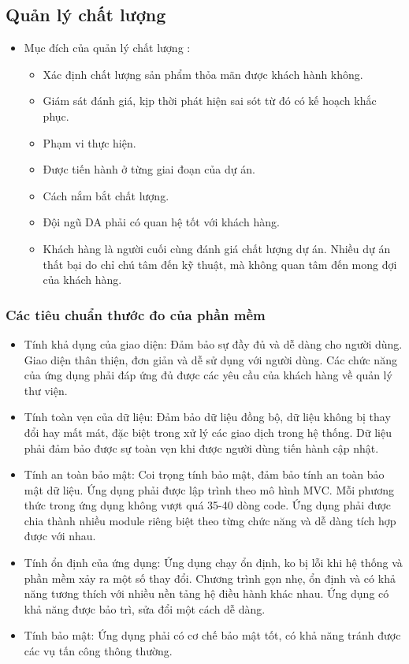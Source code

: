 \documentclass[12pt]{article}
\begin{document}
\subsection{Quản lý chất lượng}
\begin{itemize}[label=-, leftmargin=1cm]
    \item Mục đích của quản lý chất lượng :
    \begin{itemize}[label=+, leftmargin=1cm]
        \item Xác định chất lượng sản phẩm thỏa mãn được khách hành không.
        \item Giám sát đánh giá, kịp thời phát hiện sai sót từ đó có kế hoạch khắc phục.
        \item Phạm vi thực hiện.
        \item Được tiến hành ở từng giai đoạn của dự án.
        \item Cách nắm bắt chất lượng.
        \item Đội ngũ DA phải có quan hệ tốt với khách hàng.
        \item Khách hàng là người cuối cùng đánh giá chất lượng dự án. Nhiều dự án thất bại do chỉ chú tâm đến kỹ thuật, mà không quan tâm đến mong đợi của khách hàng.
    \end{itemize}
\end{itemize}

\subsubsection{Các tiêu chuẩn thước đo của phần mềm}
\begin{itemize}[label=-, leftmargin=1cm]
    \item Tính khả dụng của giao diện: Đảm bảo sự đầy đủ và dễ dàng cho người dùng. Giao diện thân thiện, đơn giản và dễ sử dụng với người dùng. Các chức năng của ứng dụng phải đáp ứng đủ được các yêu cầu của khách hàng về quản lý thư viện. 
    \item Tính toàn vẹn của dữ liệu: Đảm bảo dữ liệu đồng bộ, dữ liệu không bị thay đổi hay mất mát, đặc biệt trong xử lý các giao dịch trong hệ thống. Dữ liệu phải đảm bảo được sự toàn vẹn khi được người dùng tiến hành cập nhật.
    \item Tính an toàn bảo mật: Coi trọng tính bảo mật, đảm bảo tính an toàn bảo mật dữ liệu. Ứng dụng phải được lập trình theo mô hình MVC. Mỗi phương thức trong ứng dụng không vượt quá 35-40 dòng code. Ứng dụng phải được chia thành nhiều module riêng biệt theo từng chức năng và dễ dàng tích hợp được với nhau.
    \item Tính ổn định của ứng dụng: Ứng dụng chạy ổn định, ko bị lỗi khi hệ thống và phần mềm xảy ra một số thay đổi. Chương trình gọn nhẹ, ổn định và có khả năng tương thích với nhiều nền tảng hệ điều hành khác nhau. Ứng dụng có khả năng được bảo trì, sửa đổi một cách dễ dàng.
    \item Tính bảo mật: Ứng dụng phải có cơ chế bảo mật tốt, có khả năng tránh được các vụ tấn công thông thường.
\end{itemize}
\end{document}
